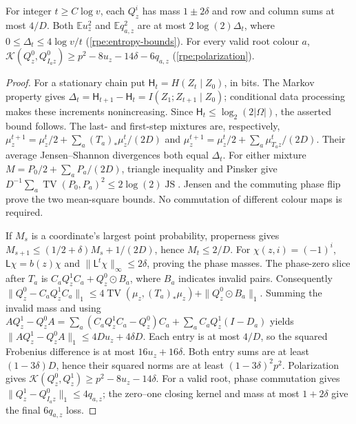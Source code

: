 \begin{lemma}\label{rpe:analytic}
For integer $t\ge{}C\log{}v$, each $Q_z^i$ has mass $1\pm2\delta$ and row and column sums at most $4/D$. Both $\mathbb{E}u_z^2$ and $\mathbb{E}q_{a,z}^2$ are at most $2\log(2)\Delta_t$, where $0\le\Delta_t\le4\log{}v/t$ \label{rpe:entropy-bounds}\textup{(\ref{rpe:entropy-bounds})}. For every valid root colour $a$, $\mathcal{K}(Q_z^0,Q_{I_az}^0)\ge{}p^2-8u_z-14\delta-6q_{a,z}$ \label{rpe:polarization}\textup{(\ref{rpe:polarization})}.
\end{lemma}
\begin{proof}
For a stationary chain put $\mathsf{H}_t=H(Z_t\mid{}Z_0)$, in bits. The Markov property gives $\Delta_t=\mathsf{H}_{t+1}-\mathsf{H}_t=I(Z_1;Z_{t+1}\mid{}Z_0)$; conditional data processing makes these increments nonincreasing.
Since $\mathsf{H}_t\le\log_2(2|\Omega|)$, the asserted bound follows. The last- and first-step mixtures are, respectively, $\mu_z^{t+1}=\mu_z^t/2+\sum_a(T_a)_*\mu_z^t/(2D)$ and $\mu_z^{t+1}=\mu_z^t/2+\sum_a\mu_{T_az}^t/(2D)$. Their average Jensen--Shannon divergences both equal $\Delta_t$. For either mixture $M=P_0/2+\sum_aP_a/(2D)$, triangle inequality and Pinsker give $D^{-1}\sum_a\operatorname{TV}(P_0,P_a)^2\le2\log(2)\operatorname{JS}$. Jensen and the commuting phase flip prove the two mean-square bounds.
No commutation of different colour maps is required.

If $M_s$ is a coordinate's largest point probability, properness gives $M_{s+1}\le(1/2+\delta)M_s+1/(2D)$, hence $M_t\le2/D$. For $\chi(z,i)=(-1)^i$, $\mathsf{L}\chi=b(z)\chi$ and $\|\mathsf{L}^t\chi\|_\infty\le2\delta$, proving the phase masses. The phase-zero slice after $T_a$ is $C_aQ_z^1C_a+Q_z^0\odot{}B_a$, where $B_a$ indicates invalid pairs. Consequently $\|Q_z^0-C_aQ_z^1C_a\|_1\le4\operatorname{TV}(\mu_z,(T_a)_*\mu_z)+\|Q_z^0\odot{}B_a\|_1$. Summing the invalid mass and using $AQ_z^1-Q_z^0A=\sum_a(C_aQ_z^1C_a-Q_z^0)C_a+\sum_aC_aQ_z^1(I-D_a)$ yields $\|AQ_z^1-Q_z^0A\|_1\le4Du_z+4\delta{}D$. Each entry is at most $4/D$, so the squared Frobenius difference is at most $16u_z+16\delta$. Both entry sums are at least $(1-3\delta)D$, hence their squared norms are at least $(1-3\delta)^2p^2$. Polarization gives $\mathcal{K}(Q_z^0,Q_z^1)\ge{}p^2-8u_z-14\delta$. For a valid root, phase commutation gives $\|Q_z^1-Q_{I_az}^0\|_1\le4q_{a,z}$; the zero--one closing kernel and mass at most $1+2\delta$ give the final $6q_{a,z}$ loss.
\end{proof}

